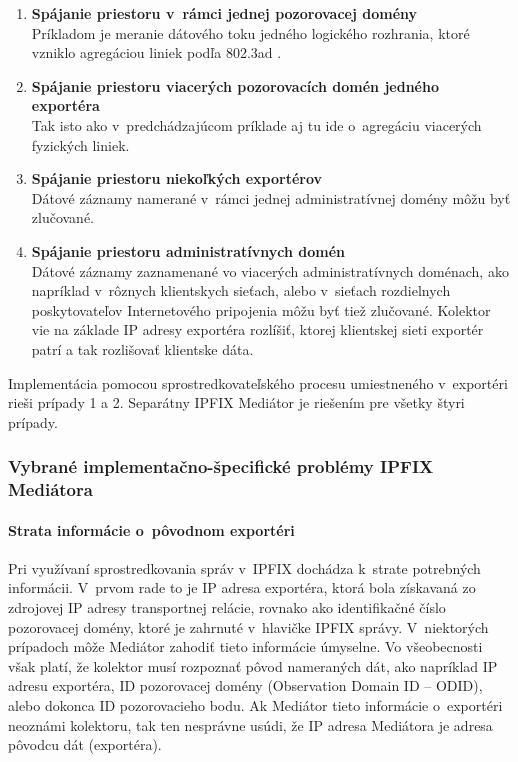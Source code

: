 \begin{enumerate}
 \item \textbf{Spájanie priestoru v~rámci jednej pozorovacej domény} \\ 
    Príkladom je meranie dátového toku jedného logického rozhrania, ktoré vzniklo agregáciou liniek 
    podľa 802.3ad \citep{ieee802.3}.
 \item \textbf{Spájanie priestoru viacerých pozorovacích domén jedného exportéra} \\
    Tak isto ako v~predchádzajúcom príklade aj tu ide o~agregáciu viacerých fyzických liniek. 
 \item \textbf{Spájanie priestoru niekoľkých exportérov} \\
    Dátové záznamy namerané v~rámci jednej administratívnej domény môžu byť zlučované.
 \item \textbf{Spájanie priestoru administratívnych domén} \\
    Dátové záznamy zaznamenané vo viacerých administratívnych doménach, ako napríklad v~rôznych klientskych 
    sieťach, alebo v~sieťach rozdielnych poskytovateľov Internetového pripojenia môžu byť tiež zlučované.
    Kolektor vie na základe IP adresy exportéra rozlíšiť, ktorej klientskej sieti exportér patrí a tak 
    rozlišovať klientske dáta.
\end{enumerate}

Implementácia pomocou sprostredkovateľského procesu umiestneného v~exportéri rieši prípady 1 a 2. 
Separátny IPFIX Mediátor je riešením pre  všetky štyri prípady.


\subsubsection{Vybrané implementačno-špecifické problémy IPFIX Mediátora} \label{sec:problems}


\paragraph{Strata informácie o~pôvodnom exportéri} \label{sec:loss_info}

Pri využívaní sprostredkovania správ v~IPFIX dochádza k~strate potrebných informácii. V~prvom rade to je 
IP adresa exportéra, ktorá bola získavaná zo zdrojovej IP adresy transportnej relácie, rovnako 
ako identifikačné číslo pozorovacej domény, ktoré je zahrnuté v~hlavičke IPFIX správy.
V~niektorých prípadoch môže Mediátor zahodiť tieto informácie úmyselne. 
Vo všeobecnosti však platí, že kolektor musí rozpoznať pôvod nameraných dát, ako napríklad IP adresu 
exportéra, ID pozorovacej domény (Observation Domain ID -- ODID), alebo dokonca ID pozorovacieho bodu. Ak Mediátor tieto informácie 
o~exportéri neoznámi kolektoru, tak ten nesprávne usúdi, že IP adresa Mediátora je adresa pôvodcu dát 
(exportéra).

